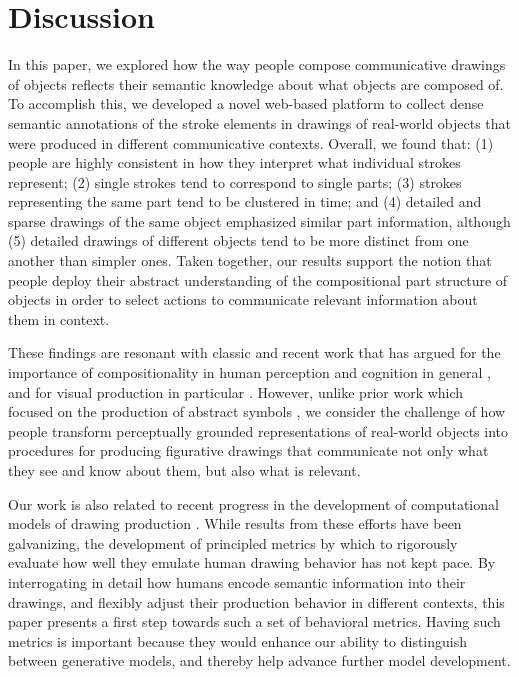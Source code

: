 \documentclass[10pt,letterpaper]{article}
\begin{document}
\section{Discussion}

In this paper, we explored how the way people compose communicative drawings of objects reflects their semantic knowledge about what objects are composed of. 
To accomplish this, we developed a novel web-based platform to collect dense semantic annotations of the stroke elements in drawings of real-world objects that were produced in different communicative contexts. 
Overall, we found that: (1) people are highly consistent in how they interpret what individual strokes represent; (2) single strokes tend to correspond to single parts; (3) strokes representing the same part tend to be clustered in time; and (4) detailed and sparse drawings of the same object emphasized similar part information, although (5) detailed drawings of different objects tend to be more distinct from one another than simpler ones. 
Taken together, our results support the notion that people deploy their abstract understanding of the compositional part structure of objects in order to select actions to communicate relevant information about them in context.  

These findings are resonant with classic and recent work that has argued for the importance of compositionality in human perception and cognition in general \cite{biederman1987recognition, battaglia2018relational,lake2017building}, and for visual production in particular \cite{lake2015human}. 
However, unlike prior work which focused on the production of abstract symbols \cite{lake2015human}, we consider the challenge of how people transform perceptually grounded representations of real-world objects into procedures for producing figurative drawings that communicate not only what they see and know about them, but also what is relevant. 

Our work is also related to recent progress in the development of computational models of drawing production \cite{ha2017neural,li2019photo}. 
While results from these efforts have been galvanizing, the development of principled metrics by which to rigorously evaluate how well they emulate human drawing behavior has not kept pace. 
By interrogating in detail how humans encode semantic information into their drawings, and flexibly adjust their production behavior in different contexts, this paper presents a first step towards such a set of behavioral metrics.
Having such metrics is important because they would enhance our ability to distinguish between generative models, and thereby help advance further model development. 
\end{document}
